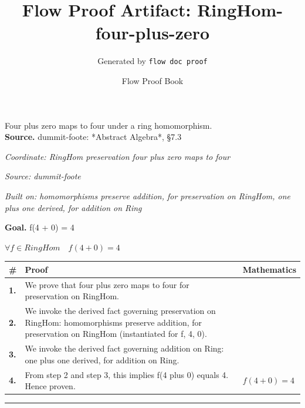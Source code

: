 \documentclass[11pt]{article}
\title{Flow Proof Artifact: RingHom-four-plus-zero}
\author{Generated by \texttt{flow doc proof}}
\date{Flow Proof Book}
\theoremstyle{definition}
\begin{document}
\maketitle
Four plus zero maps to four under a ring homomorphism.\\[0.5em]
\textbf{Source.} dummit-foote: *Abstract Algebra*, §7.3\\[0.5em]
\bigskip
{}\par
\smallskip\noindent\textit{Coordinate: RingHom \cdot preservation \cdot four plus zero maps to four}\par
\smallskip\noindent\textit{Source: dummit-foote}\par
\smallskip\noindent\textit{Built on: homomorphisms preserve addition, for preservation on RingHom, one plus one derived, for addition on Ring}\par
\medskip
\noindent\textbf{Goal.} f(4 + 0) = 4\par
\noindent$\displaystyle \forall f \in RingHom\quad f(4 + 0) = 4$\par
\medskip
\noindent
\begin{tabular}{@{} >{\raggedright\arraybackslash}p{} >{\raggedright\arraybackslash}p{} >{\raggedleft\arraybackslash}p{} @{}}
\textbf{\#} & \textbf{Proof} & \textbf{Mathematics} \\
\midrule
\textbf{1.} & We prove that four plus zero maps to four for preservation on RingHom. & \\[0.45em]
\textbf{2.} & We invoke the derived fact governing preservation on RingHom: homomorphisms preserve addition, for preservation on RingHom (instantiated for f, 4, 0). & \\[0.45em]
\textbf{3.} & We invoke the derived fact governing addition on Ring: one plus one derived, for addition on Ring. & \\[0.45em]
\textbf{4.} & From step 2 and step 3, this implies f(4 plus 0) equals 4. Hence proven. & $\displaystyle f(4 + 0) = 4$ \\[0.45em]
\bottomrule
\end{tabular}
\label{thm:RingHom-preservation-four_plus_zero_maps_to_four}
\par\medskip\hrule
\end{document}
